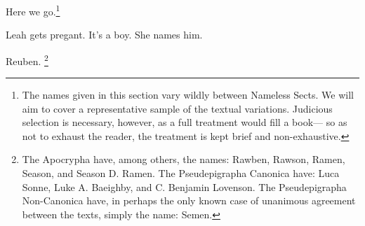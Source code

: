 {
}
{
}
{
	Here we go.\footnote{
		The names given in this section vary wildly between Nameless Sects.
		We will aim to cover a representative sample of the textual variations.
		Judicious selection is necessary, however, as a full treatment would fill a book—
		so as not to exhaust the reader, the treatment is kept brief and non-exhaustive.
	}

	Leah gets pregant. It's a boy. She names him.

	Reuben.%
	\footnote{
		The Apocrypha have, among others, the names: Rawben, Rawson, Ramen, Season, and Season D. Ramen.
		The Pseudepigrapha Canonica have: Luca Sonne, Luke A. Baeighby, and C. Benjamin Lovenson.
		The Pseudepigrapha Non-Canonica have, in perhaps the only known case of unanimous
			agreement between the texts, simply the name: Semen.
	}

}

